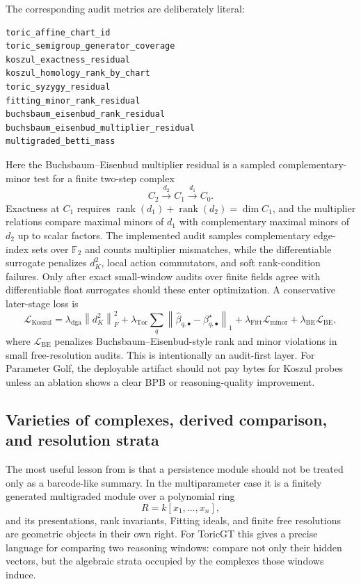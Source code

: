 \documentclass[11pt]{article}
\theoremstyle{definition}
\theoremstyle{plain}
\theoremstyle{remark}
\numberwithin{equation}{section}
\newcommand{\rank}{\operatorname{rank}}
\newcommand{\norm}[1]{\left\lVert #1\right\rVert}
\begin{document}
The corresponding audit metrics are deliberately literal:
\begin{verbatim}
toric_affine_chart_id
toric_semigroup_generator_coverage
koszul_exactness_residual
koszul_homology_rank_by_chart
toric_syzygy_residual
fitting_minor_rank_residual
buchsbaum_eisenbud_rank_residual
buchsbaum_eisenbud_multiplier_residual
multigraded_betti_mass
\end{verbatim}
Here the Buchsbaum--Eisenbud multiplier residual is a sampled complementary-minor test for a finite two-step complex
\begin{equation}
  C_2\xrightarrow{d_2}C_1\xrightarrow{d_1}C_0.
\end{equation}
Exactness at $C_1$ requires $\rank(d_1)+\rank(d_2)=\dim C_1$, and the multiplier relations compare maximal minors of $d_1$ with complementary maximal minors of $d_2$ up to scalar factors.  The implemented audit samples complementary edge-index sets over $\mathbb F_2$ and counts multiplier mismatches, while the differentiable surrogate penalizes $d_K^2$, local action commutators, and soft rank-condition failures.
Only after exact small-window audits over finite fields agree with differentiable float surrogates should these enter optimization.  A conservative later-stage loss is
\begin{equation}
  \mathcal L_{\mathrm{Koszul}}=
  \lambda_{\mathrm{dga}}\norm{d_K^2}_F^2+
  \lambda_{\mathrm{Tor}}\sum_q\norm{\widehat\beta_{q,\bullet}-\beta^\star_{q,\bullet}}_1+
  \lambda_{\mathrm{Fitt}}\mathcal L_{\mathrm{minor}}+
  \lambda_{\mathrm{BE}}\mathcal L_{\mathrm{BE}},
\end{equation}
where $\mathcal L_{\mathrm{BE}}$ penalizes Buchsbaum--Eisenbud-style rank and minor violations in small free-resolution audits.  This is intentionally an audit-first layer.  For Parameter Golf, the deployable artifact should not pay bytes for Koszul probes unless an ablation shows a clear BPB or reasoning-quality improvement.

\subsection{Varieties of complexes, derived comparison, and resolution strata}
\label{subsec:varieties-of-complexes}

The most useful lesson from \cite{schreiber2022multiparameter} is that a persistence module should not be treated only as a barcode-like summary.  In the multiparameter case it is a finitely generated multigraded module over a polynomial ring
\begin{equation}
  R=k[x_1,\ldots,x_n],
\end{equation}
and its presentations, rank invariants, Fitting ideals, and finite free resolutions are geometric objects in their own right.  For ToricGT this gives a precise language for comparing two reasoning windows: compare not only their hidden vectors, but the algebraic strata occupied by the complexes those windows induce.
\end{document}
